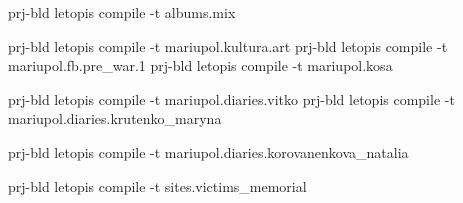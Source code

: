  
 
 
 
 

prj-bld letopis compile -t albums.mix

prj-bld letopis compile -t mariupol.kultura.art
prj-bld letopis compile -t mariupol.fb.pre_war.1
prj-bld letopis compile -t mariupol.kosa

prj-bld letopis compile -t mariupol.diaries.vitko
prj-bld letopis compile -t mariupol.diaries.krutenko_maryna

prj-bld letopis compile -t mariupol.diaries.korovanenkova_natalia

prj-bld letopis compile -t sites.victims_memorial
